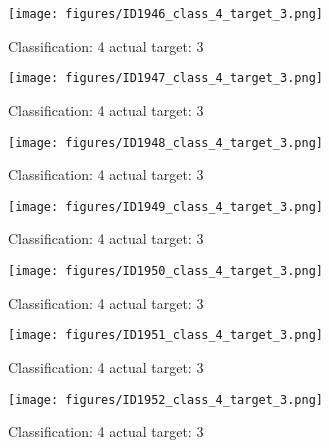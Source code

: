 \begin{figure}[h!]
\begin{center}
\texttt{[image: figures/ID1946\_class\_4\_target\_3.png]}
\end{center}
\caption{ Classification: 4 actual target: 3}
\label{fig:ID1946_class_4_target_3}
\end{figure}
\begin{figure}[h!]
\begin{center}
\texttt{[image: figures/ID1947\_class\_4\_target\_3.png]}
\end{center}
\caption{ Classification: 4 actual target: 3}
\label{fig:ID1947_class_4_target_3}
\end{figure}
\begin{figure}[h!]
\begin{center}
\texttt{[image: figures/ID1948\_class\_4\_target\_3.png]}
\end{center}
\caption{ Classification: 4 actual target: 3}
\label{fig:ID1948_class_4_target_3}
\end{figure}
\begin{figure}[h!]
\begin{center}
\texttt{[image: figures/ID1949\_class\_4\_target\_3.png]}
\end{center}
\caption{ Classification: 4 actual target: 3}
\label{fig:ID1949_class_4_target_3}
\end{figure}
\begin{figure}[h!]
\begin{center}
\texttt{[image: figures/ID1950\_class\_4\_target\_3.png]}
\end{center}
\caption{ Classification: 4 actual target: 3}
\label{fig:ID1950_class_4_target_3}
\end{figure}
\begin{figure}[h!]
\begin{center}
\texttt{[image: figures/ID1951\_class\_4\_target\_3.png]}
\end{center}
\caption{ Classification: 4 actual target: 3}
\label{fig:ID1951_class_4_target_3}
\end{figure}
\begin{figure}[h!]
\begin{center}
\texttt{[image: figures/ID1952\_class\_4\_target\_3.png]}
\end{center}
\caption{ Classification: 4 actual target: 3}
\label{fig:ID1952_class_4_target_3}
\end{figure}
